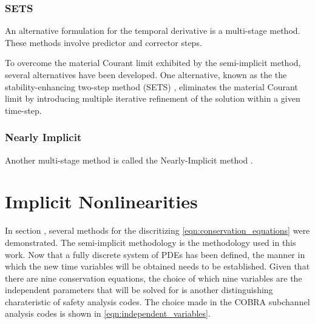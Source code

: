 \subsubsection{SETS}
\label{subsubsect:numerics_sets}
An alternative formulation for the temporal derivative is a multi-stage method.
These methods involve predictor and corrector steps.

To overcome the material Courant limit exhibited by the semi-implicit method, several alternatives have been developed.
One alternative, known as the the stability-enhancing two-step method (SETS) \cite{Mahaffy1982}, eliminates the material Courant limit by introducing multiple iterative refinement of the solution within a given time-step.

\subsubsection{Nearly Implicit}
\label{subsubsect:numerics_nearly_implicit}
Another multi-stage method is called the Nearly-Implicit method \cite{Trapp1986}.
\section{Implicit Nonlinearities}
\label{sect:nonlinearities}
In section , several methods for the discritizing \eqref{eqn:conservation_equations} were demonstrated.
The semi-implicit methodology is the methodology used in this work.
Now that a fully discrete system of PDEs has been defined, the manner in which the new time variables will be obtained needs to be established.
Given that there are nine conservation equations, the choice of which nine variables are the independent parameters that will be solved for is another distinguishing charateristic of safety analysis codes.
The choice made in the COBRA subchannel analysis codes is shown in \eqref{eqn:independent_variables}.

